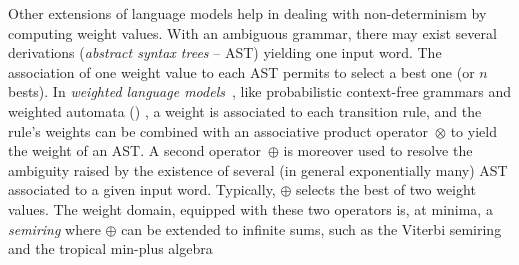 Other extensions of language models  %
help in dealing with non-determinism by computing weight values.
With an ambiguous grammar, there may exist several derivations
(\emph{abstract syntax trees} -- AST) %
yielding one input word. %
The association of one weight value %
to each AST permits to select a best one (or $n$ bests). %
In \emph{weighted language models}~\cite{Goodman99SemiringParsing,Nederhof03weightedParsing,MorbitzVogler19weighted-parsing},
like \eg probabilistic context-free grammars %
and weighted automata (\WA) \cite{Droste09handbook},
a weight is associated to each transition rule, %
and the rule's weights can be combined with an
associative product operator~$\otimes$ to yield the weight of an AST.
A second operator~$\oplus$
is moreover used to resolve the ambiguity raised by the existence
of several (in general exponentially many) AST
associated to a given input word.
Typically, $\oplus$  selects the best of two weight values.
The weight domain, equipped with these two operators is, at minima,
a \emph{semiring} %
where $\oplus$ can be extended to infinite sums,
such as the Viterbi semiring and the tropical min-plus algebra%

